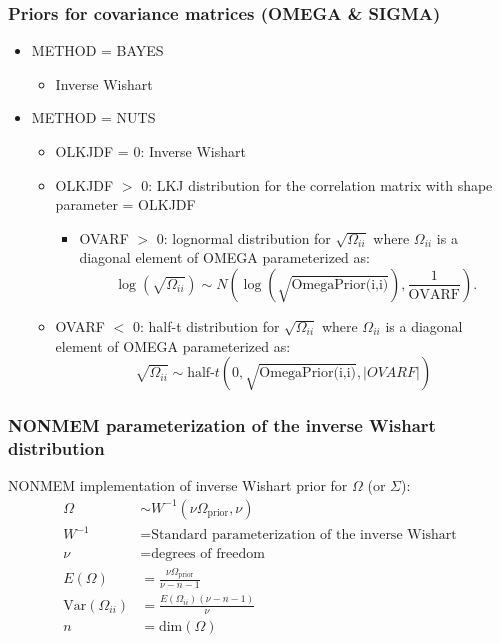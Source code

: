 \documentclass[handout]{beamer}
\begin{document}
\begin{frame}
  \frametitle{Priors for covariance matrices (OMEGA \& SIGMA)}

    \begin{itemize}
  \item METHOD = BAYES
    \begin{itemize}
    \item Inverse Wishart
    \end{itemize}
    \item METHOD = NUTS
      \begin{itemize}
      \item OLKJDF = 0: Inverse Wishart
       \item OLKJDF $>$ 0: LKJ distribution for the correlation matrix
         with shape parameter = OLKJDF
         \begin{itemize}
         \item OVARF $>$ 0: lognormal distribution for
           $\sqrt{\Omega_{ii}}$ where $\Omega_{ii}$ is a diagonal
           element of OMEGA parameterized as:
           $$
           \log(\sqrt{\Omega_{ii}}) \sim
           N\left(\log\left(\sqrt{\text{OmegaPrior(i,i)}}\right), \frac{1}{\text{OVARF}}\right).
           $$
         \end{itemize}
       \item OVARF $<$ 0:  half-t distribution for
           $\sqrt{\Omega_{ii}}$ where $\Omega_{ii}$ is a diagonal
           element of OMEGA parameterized as:
           $$
           \sqrt{\Omega_{ii}} \sim \text{half-}t\left(0,
             \sqrt{\text{OmegaPrior(i,i)}}, \left|OVARF\right|\right)
             $$
     \end{itemize}
    \end{itemize}

  
\end{frame}

\begin{frame}
  \frametitle{NONMEM parameterization of the inverse Wishart distribution}
  
NONMEM implementation of inverse Wishart prior for $\Omega$ (or
    $\Sigma$):
    \begin{align*}
      \Omega &\sim W^{-1}\left(\nu\Omega_\text{prior}, \nu\right) \\
W^{-1} &= \text{Standard parameterization of the inverse Wishart} \\
\nu &= \text{degrees of freedom} \\
E\left(\Omega\right) &= \frac{\nu\Omega_\text{prior}}{\nu - n - 1} \\
\text{Var}\left(\Omega_{ii}\right) &= \frac{E\left(\Omega_{ii}\right)  \left(\nu - n -
                          1\right)}{\nu} \\
n &= \text{dim}\left(\Omega\right)
    \end{align*}

\end{frame}
\end{document}
